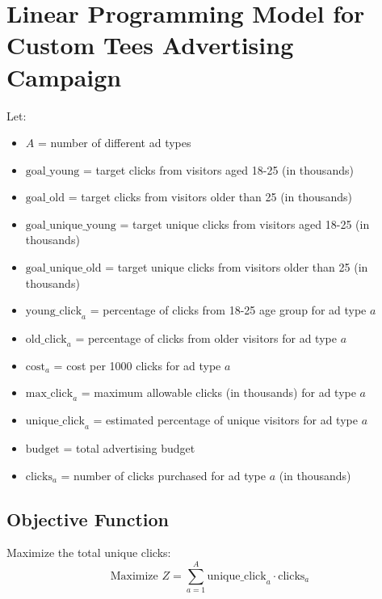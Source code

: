 \documentclass{article}
\begin{document}
\section*{Linear Programming Model for Custom Tees Advertising Campaign}

Let:
\begin{itemize}
    \item \( A \) = number of different ad types
    \item \( \text{goal\_young} \) = target clicks from visitors aged 18-25 (in thousands)
    \item \( \text{goal\_old} \) = target clicks from visitors older than 25 (in thousands)
    \item \( \text{goal\_unique\_young} \) = target unique clicks from visitors aged 18-25 (in thousands)
    \item \( \text{goal\_unique\_old} \) = target unique clicks from visitors older than 25 (in thousands)
    \item \( \text{young\_click}_a \) = percentage of clicks from 18-25 age group for ad type \( a \)
    \item \( \text{old\_click}_a \) = percentage of clicks from older visitors for ad type \( a \)
    \item \( \text{cost}_a \) = cost per 1000 clicks for ad type \( a \)
    \item \( \text{max\_click}_a \) = maximum allowable clicks (in thousands) for ad type \( a \)
    \item \( \text{unique\_click}_a \) = estimated percentage of unique visitors for ad type \( a \)
    \item \( \text{budget} \) = total advertising budget
    \item \( \text{clicks}_a \) = number of clicks purchased for ad type \( a \) (in thousands)
\end{itemize}

\subsection*{Objective Function}
Maximize the total unique clicks:
\[
\text{Maximize } Z = \sum_{a=1}^{A} \text{unique\_click}_a \cdot \text{clicks}_a
\]
\end{document}
